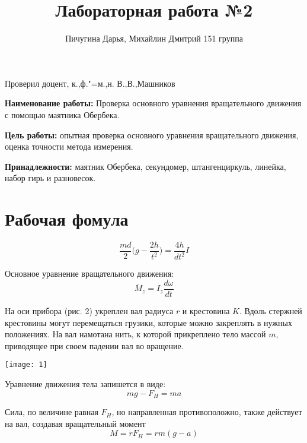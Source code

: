 \documentclass{article}
\begin{document}
\author{Пичугина Дарья, Михайлин Дмитрий 151 группа}
\title{Лабораторная работа №2}
\maketitle

\begin{flushright}
    Проверил доцент, к.,ф."=м.,н. \qquad\qquad  \qquad\qquad \qquad\qquad В.,В.,Машников
\end{flushright}

\textbf{Наименование работы:} Проверка основного уравнения 
вращательного движения с помощью маятника Обербека.

\textbf{Цель работы:} опытная проверка основного уравнения 
вращательного движения, оценка точности метода измерения.

\textbf{Принадлежности:} маятник Обербека, секундомер,
штангенциркуль, линейка, набор гирь и разновесок.

\section{Рабочая фомула}

\begin{equation}
    \frac{md}{2}\Big(g-\frac{2h}{t^2}\Big) = \frac{4h}{dt^2}I
\end{equation}
\vspace{1cm}

Основное уравнение вращательного движения: 
\begin{equation}
    \bar{M}_z=I_z\frac{d\omega}{dt} 
\end{equation}

На оси прибора (рис. 2) укреплен вал радиуса $r$ и крестовина
$K$. Вдоль стержней крестовины могут перемещаться грузики,
которые можно закреплять в нужных положениях. На вал намотана
нить, к которой прикреплено тело массой $m$, приводящее при
своем падении вал во вращение.

\texttt{[image: 1]}

Уравнение движения тела запишется в виде:
\begin{equation}
    mg - F_H = ma
\end{equation}

Сила, по величине равная $F_H$, но направленная противоположно,
также действует на вал, создавая вращательный момент
\begin{equation}
    M = rF_H = rm(g-a)
\end{equation}
\end{document}

